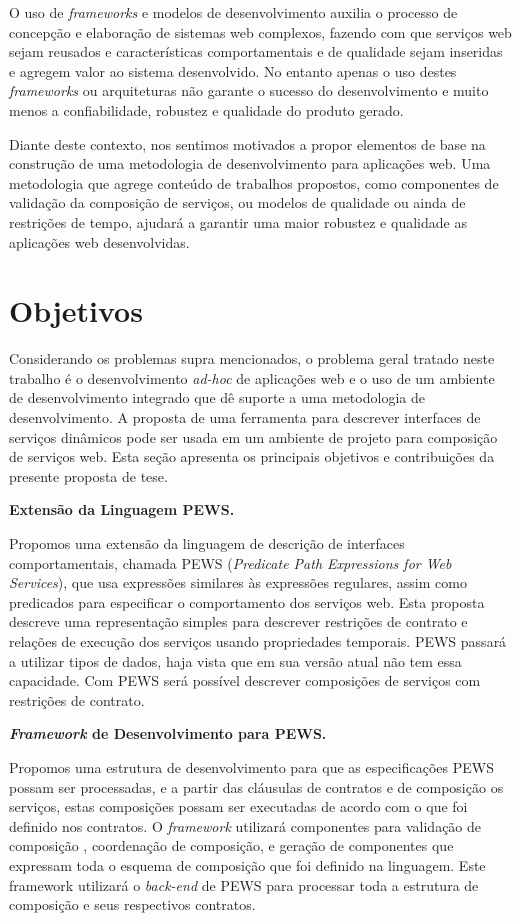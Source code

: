 O uso de \textit{frameworks} e modelos de desenvolvimento auxilia o processo de
concepção e elaboração de sistemas web complexos, fazendo com que serviços web
sejam reusados e características comportamentais e de qualidade sejam inseridas
e agregem valor ao sistema desenvolvido. No entanto apenas o uso destes
\textit{frameworks} ou arquiteturas não garante o sucesso do desenvolvimento e
muito menos a confiabilidade, robustez e qualidade do produto gerado. 

Diante deste contexto, nos sentimos motivados a propor elementos de base na
construção de uma metodologia de desenvolvimento para aplicações web. Uma
metodologia que agrege conteúdo de trabalhos propostos, como componentes de
validação da composição de serviços, ou modelos de qualidade ou ainda de
restrições de tempo, ajudará a garantir uma maior robustez e qualidade as
aplicações web desenvolvidas.
 
 
\section{Objetivos}
\label{sec:Intro-objectives}
  
Considerando os problemas supra mencionados, o problema geral tratado neste
trabalho é o desenvolvimento \textit{ad-hoc} de aplicações web e o uso
de um ambiente de desenvolvimento integrado que dê suporte a uma metodologia de desenvolvimento. A proposta de
uma ferramenta para descrever interfaces de serviços dinâmicos pode ser usada
em um ambiente de projeto para composição de serviços web. Esta seção apresenta
os principais objetivos e contribuições da presente proposta de tese.

\textbf{Extensão da Linguagem PEWS.}

Propomos uma extensão da linguagem de descrição de interfaces
comportamentais, chamada PEWS \cite{BaCAM05} (\textit{Predicate Path Expressions for
Web Services}), que usa expressões similares às expressões regulares, assim
como predicados para especificar o comportamento dos serviços web. Esta
proposta descreve uma representação simples para descrever restrições de
contrato e relações de execução dos serviços usando propriedades temporais.
PEWS passará a utilizar tipos de dados, haja vista que em sua versão atual
não tem essa capacidade. Com PEWS será possível
descrever composições de serviços com restrições de contrato.
 
\textbf{\textit{Framework} de Desenvolvimento para PEWS.}

Propomos uma estrutura de desenvolvimento para que as especificações PEWS
possam ser processadas, e a partir das cláusulas de contratos e de composição
os serviços, estas composições possam ser executadas de acordo com o que foi
definido nos contratos. O \textit{framework} utilizará componentes para
validação de composição \cite{ba2008}, coordenação de composição, e geração de
componentes que expressam toda o esquema de composição que foi definido na
linguagem.  Este framework utilizará o \textit{back-end} de PEWS para processar
toda a estrutura de composição e seus respectivos contratos.

